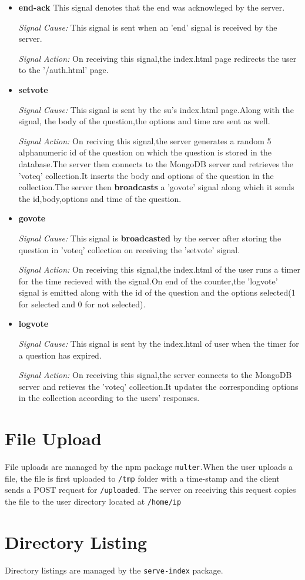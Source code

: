 \documentclass[a4paper,10pt]{article}
\begin{document}
\begin{itemize}
\item \textbf{end-ack}
This signal denotes that the end was acknowleged by the server.

\textit{Signal Cause:}
    This signal is sent when an 'end' signal is received by the server.

\textit{Signal Action:}
    On receiving this signal,the index.html page redirects the user to the
'/auth.html' page.

\item \textbf{setvote}

\textit{Signal Cause:}
    This signal is sent by the su's index.html page.Along with the signal,
the body of the question,the options and time are sent as well.

\textit{Signal Action:}
    On reciving this signal,the server generates a random 5 alphanumeric id 
of the question on which the question is stored in the database.The server then
connects to the MongoDB server and retrieves the 'voteq' collection.It inserts the 
body and options of the question in the collection.The server then \textbf{broadcasts} a 
'govote' signal along which it sends the id,body,options and time of the question.


\item \textbf{govote}

\textit{Signal Cause:}
    This signal is \textbf{broadcasted} by the server after storing the question in 'voteq'
collection on receiving the 'setvote' signal.

\textit{Signal Action:}
    On receiving this signal,the index.html of the user runs a timer for the time recieved
with the signal.On end of the counter,the 'logvote' signal is emitted along with the id of
the question and the options selected(1 for selected and 0 for not selected).


\item \textbf{logvote}

\textit{Signal Cause:}
    This signal is sent by the index.html of user when the timer for a question has expired.

\textit{Signal Action:}
    On receiving this signal,the server connects to the MongoDB server and retieves the 'voteq'
collection.It updates the corresponding options in the collection according to the users' 
responses.
\end{itemize}

\section{File Upload}
File uploads are managed by the npm package \texttt{multer}.When the user uploads a file,
the file is first uploaded to \texttt{/tmp} folder with a time-stamp and the client sends a POST request for \texttt{/uploaded}.
The server on receiving this request copies the file to the user directory located at \texttt{/home/ip}

\section{Directory Listing}
Directory listings are managed by the \texttt{serve-index} package.
\end{document}
